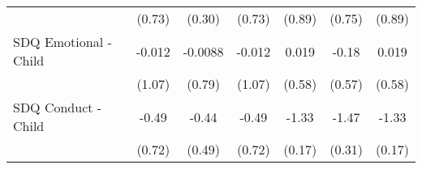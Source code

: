 {\begin{tabular}{l*{6}{c}}
            &      (0.73)         &      (0.30)         &      (0.73)         &      (0.89)         &      (0.75)         &      (0.89)         \\
\addlinespace
SDQ Emotional - Child&      -0.012         &     -0.0088         &      -0.012         &       0.019         &       -0.18         &       0.019         \\
            &      (1.07)         &      (0.79)         &      (1.07)         &      (0.58)         &      (0.57)         &      (0.58)         \\
\addlinespace
SDQ Conduct - Child&       -0.49         &       -0.44         &       -0.49         &       -1.33\sym{***}&       -1.47\sym{***}&       -1.33\sym{***}\\
            &      (0.72)         &      (0.49)         &      (0.72)         &      (0.17)         &      (0.31)         &      (0.17)         \\
\bottomrule
\end{tabular}
}
